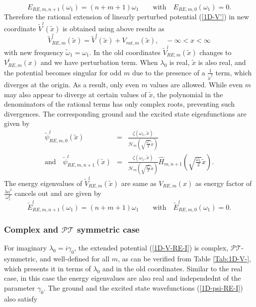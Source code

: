\documentclass[a4paper, 12pt]{article}
\newcommand{\td}[1]{\tilde{#1}}
\begin{document}
\begin{equation}\label{1D-E_RE-x}
E_{RE,m, n+1}(\omega_{1})=\left(n+m+1\right)\omega_1 \qquad\mbox{with}\quad E_{RE,m,0}(\omega_{1})=0.
\end{equation}
Therefore the rational extension of linearly perturbed potential (\ref{1D-V'}) in new coordinate $\td{V}^l(\td{x})$ is obtained using above results as
\begin{equation}\label{1D-V-RE-I}
    \tilde{V}_{RE,m}^l(\td{x}) = \td{V}^l(\td{x}) + V_{rat,m}\left(\td{x}\right), \quad -\infty < x < \infty
\end{equation}
with new frequency $\td{\omega}_1=\omega_1$. In the old coordinates $\tilde{V}_{RE,m}^l(\td{x})$ changes to $V_{RE,m}^l(x)$ and we have perturbation term.
% 
When \(\lambda_0\) is real, \(\tilde{x}\) is also real, and the potential becomes singular for odd \( m \) due to the presence of a \(\frac{1}{\tilde{x}^2}\) term, which diverges at the origin. As a result, only even \( m \) values are allowed. While even \( m \) may also appear to diverge at certain values of \(\tilde{x}\), the polynomial in the denominators of the rational terms has only complex roots, preventing such divergences.
% 
The corresponding ground and the excited state eigenfunctions are given by
\begin{eqnarray}\label{1D-psi-RE-I}
		\td{\psi}_{RE,m,0}^l(\td{x}) &=& \frac{\zeta\left(\omega_1,\td{x}\right)}{\mathcal{H}_m\left(\sqrt{\frac{\omega_1}{2}} \td{x}\right)}\nonumber\\
\mbox{and} \quad 
    \td{\psi}_{RE,m,n+1}^l(\td{x}) &=& \frac{\zeta\left(\omega_1,\td{x}\right)}{\mathcal{H}_m\left(\sqrt{\frac{\omega_1}{2}} \td{x}\right)}\hat{H}_{m,n+1}\left(\sqrt{\frac{\omega_1}{2}} \td{x}\right).
\end{eqnarray}
The energy eigenvalues of $\td{V}^l_{RE,m}(\td{x})$ are same as $V_{RE,m}(x)$ as energy factor of $\frac{\text{$\lambda $o}^2}{\omega_1^2}$ cancels out \cite{Kumar:2024tsz} and are given by
\begin{equation}\label{1D-E_RE-I}
	\td{E}_{RE,m, n+1}^l(\omega_{1})=\left(n+m+1\right)\omega_1 \qquad\mbox{with}\quad \td{E}_{RE,m,0}^l(\omega_{1})=0.
\end{equation}

\subsubsection {Complex and $\mathcal{PT}$ symmetric case} 
For imaginary \(\lambda_0 = i\gamma_0\), the extended potential (\ref{1D-V-RE-I}) is complex, \(\mathcal{PT}\)-symmetric, and well-defined for all \( m \), as can be verified from Table \ref{Tab:1D-V-}, which presents it in terms of \(\lambda_0\) and in the old coordinates. Similar to the real case, in this case the energy eigenvalues are also real and independednt of the parameter $\gamma_0$. The ground and the excited state wavefunctions (\ref{1D-psi-RE-I}) also satisfy
\end{document}
